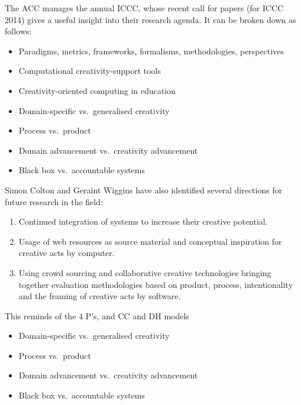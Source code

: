 The ACC manages the annual \ac{ICCC}, whose recent call for papers  (for \ac{ICCC} 2014) gives a useful insight into their research agenda. It can be broken down as follows:

\begin{itemize}
  \item Paradigms, metrics, frameworks, formalisms, methodologies, perspectives
  \item Computational creativity-support tools
  \item Creativity-oriented computing in education
  \item Domain-specific vs.\ generalised creativity
  \item Process vs.\ product
  \item Domain advancement vs.\ creativity advancement
  \item Black box vs.\ accountable systems
\end{itemize}

Simon Colton and Geraint Wiggins have also identified several directions for future research in the field: \autocite[p.5]{Colton2012}

\begin{enumerate}
  \item Continued integration of systems to increase their creative potential.
  \item Usage of web resources as source material and conceptual inspiration for creative acts by computer.
  \item Using crowd sourcing and collaborative creative technologies bringing together evaluation methodologies based on product, process, intentionality and the framing of creative acts by software.
\end{enumerate}

\begin{draft}
  This reminds of the 4 P’s, and \ac{CC} and \ac{DH} models
\end{draft}

\begin{shaded}
  \begin{itemize}
  \item Domain-specific vs.\ generalised creativity
  \item Process vs.\ product
  \item Domain advancement vs.\ creativity advancement
  \item Black box vs.\ accountable systems
  \end{itemize}
\end{shaded}


